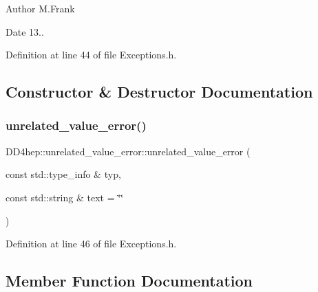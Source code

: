 \begin{DoxyAuthor}{Author}
M.\+Frank 
\end{DoxyAuthor}
\begin{DoxyDate}{Date}
13.. 
\end{DoxyDate}


Definition at line 44 of file Exceptions.\+h.



\subsection{Constructor \& Destructor Documentation}
\hypertarget{struct_d_d4hep_1_1unrelated__value__error_adb6fa7ac7ea37b8575dd0550a197555b}{}\label{struct_d_d4hep_1_1unrelated__value__error_adb6fa7ac7ea37b8575dd0550a197555b} 
\subsubsection{\texorpdfstring{unrelated\+\_\+value\+\_\+error()}{unrelated\_value\_error()}}
{\footnotesize\ttfamily D\+D4hep\+::unrelated\+\_\+value\+\_\+error\+::unrelated\+\_\+value\+\_\+error (\begin{DoxyParamCaption}\item[{const std\+::type\+\_\+info \&}]{typ,  }\item[{const std\+::string \&}]{text = {\ttfamily \char`\"{}\char`\"{}} }\end{DoxyParamCaption})\hspace{0.3cm}{\ttfamily [inline]}}



Definition at line 46 of file Exceptions.\+h.



\subsection{Member Function Documentation}
\hypertarget{struct_d_d4hep_1_1unrelated__value__error_af06e3da0ede17bf6c0c49dd82d615deb}{}\label{struct_d_d4hep_1_1unrelated__value__error_af06e3da0ede17bf6c0c49dd82d615deb} 
